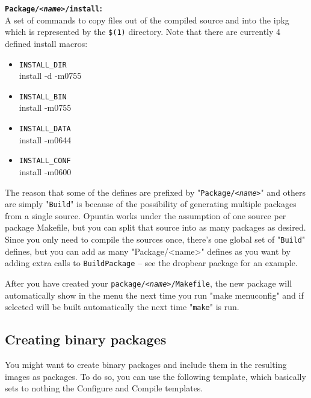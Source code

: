 \textbf{\texttt{Package/\textit{<name>}/install}:} \\
   A set of commands to copy files out of the compiled source and into the ipkg
   which is represented by the \texttt{\$(1)} directory. Note that there are currently
   4 defined install macros:
   \begin{itemize}
       \item \texttt{INSTALL\_DIR} \\
           install -d -m0755
       \item \texttt{INSTALL\_BIN} \\
           install -m0755
       \item \texttt{INSTALL\_DATA} \\
           install -m0644
       \item \texttt{INSTALL\_CONF} \\
           install -m0600
   \end{itemize}

The reason that some of the defines are prefixed by "\texttt{Package/\textit{<name>}}"
and others are simply "\texttt{Build}" is because of the possibility of generating
multiple packages from a single source. Opuntia works under the assumption of one
source per package Makefile, but you can split that source into as many packages as
desired. Since you only need to compile the sources once, there's one global set of
"\texttt{Build}" defines, but you can add as many "Package/<name>" defines as you want
by adding extra calls to \texttt{BuildPackage} -- see the dropbear package for an example.

After you have created your \texttt{package/\textit{<name>}/Makefile}, the new package
will automatically show in the menu the next time you run "make menuconfig" and if selected
will be built automatically the next time "\texttt{make}" is run.

\subsection{Creating binary packages}

You might want to create binary packages and include them in the resulting images as packages.
To do so, you can use the following template, which basically sets to nothing the Configure and
Compile templates.

